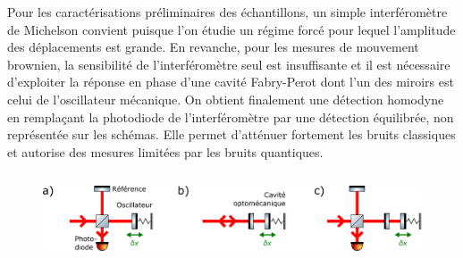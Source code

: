 \documentclass[12pt,a4paper]{article}
\begin{document}
Pour les caractérisations préliminaires des échantillons, un simple interféromètre de Michelson convient puisque l'on étudie un régime forcé pour lequel l'amplitude des déplacements est grande.
En revanche, pour les mesures de mouvement brownien, la sensibilité de l'interféromètre seul est insuffisante et il est nécessaire d'exploiter la réponse en phase d'une cavité Fabry-Perot dont l'un des miroirs est celui de l'oscillateur mécanique.
On obtient finalement une détection homodyne en remplaçant la photodiode de l'interféromètre par une détection équilibrée, non représentée sur les schémas.
Elle permet d'atténuer fortement les bruits classiques et autorise des mesures limitées par les bruits quantiques. 

\begin{figure}
\center
\includegraphics[height=75pt]{figures/detection_scheme.png}


\end{figure}
\end{document}
